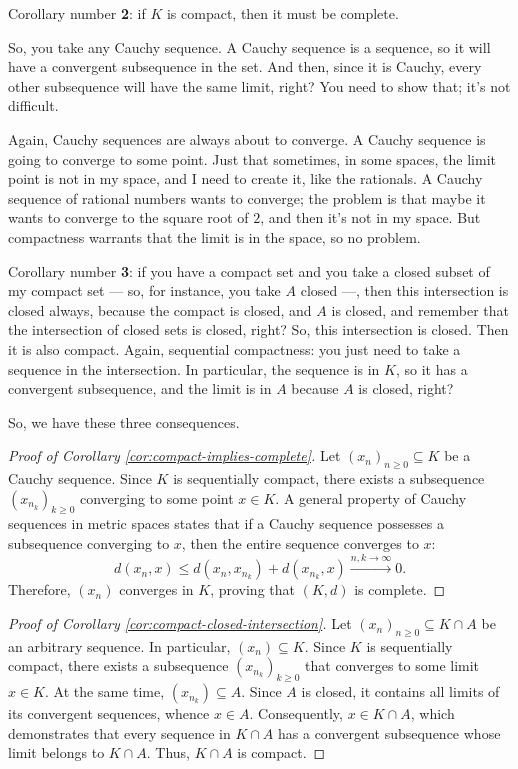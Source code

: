 \begin{speech}[00:25:12 - 00:27:12]
Corollary number \textbf{2}: if $K$ is compact, then it must be complete.

So, you take any Cauchy sequence. A Cauchy sequence is a sequence, so it will have a convergent subsequence in the set. And then, since it is Cauchy, every other subsequence will have the same limit, right? You need to show that; it's not difficult.

Again, Cauchy sequences are always about to converge. A Cauchy sequence is going to converge to some point. Just that sometimes, in some spaces, the limit point is not in my space, and I need to create it, like the rationals. A Cauchy sequence of rational numbers wants to converge; the problem is that maybe it wants to converge to the square root of $2$, and then it's not in my space. But compactness warrants that the limit is in the space, so no problem.

Corollary number \textbf{3}: if you have a compact set and you take a closed subset of my compact set --- so, for instance, you take $A$ closed ---, then this intersection is closed always, because the compact is closed, and $A$ is closed, and remember that the intersection of closed sets is closed, right? So, this intersection is closed. Then it is also compact. Again, sequential compactness: you just need to take a sequence in the intersection. In particular, the sequence is in $K$, so it has a convergent subsequence, and the limit is in $A$ because $A$ is closed, right?

So, we have these three consequences.
\end{speech}

\begin{content}
\begin{proof}[Proof of Corollary \ref{cor:compact-implies-complete}]
Let $(x_n)_{n \ge 0} \subseteq K$ be a Cauchy sequence.
Since $K$ is sequentially compact, there exists a subsequence $(x_{n_k})_{k \ge 0}$ converging to some point $x \in K$.
A general property of Cauchy sequences in metric spaces states that if a Cauchy sequence possesses a subsequence converging to $x$, then the entire sequence converges to $x$:
\[
d(x_n, x) \le d(x_n, x_{n_k}) + d(x_{n_k}, x) \xrightarrow{n, k \to \infty} 0.
\]
Therefore, $(x_n)$ converges in $K$, proving that $(K, d)$ is complete.
\end{proof}

\begin{proof}[Proof of Corollary \ref{cor:compact-closed-intersection}]
Let $(x_n)_{n \ge 0} \subseteq K \cap A$ be an arbitrary sequence.
In particular, $(x_n) \subseteq K$. Since $K$ is sequentially compact, there exists a subsequence $(x_{n_k})_{k \ge 0}$ that converges to some limit $x \in K$.
At the same time, $(x_{n_k}) \subseteq A$. Since $A$ is closed, it contains all limits of its convergent sequences, whence $x \in A$.
Consequently, $x \in K \cap A$, which demonstrates that every sequence in $K \cap A$ has a convergent subsequence whose limit belongs to $K \cap A$. Thus, $K \cap A$ is compact.
\end{proof}
\end{content}

